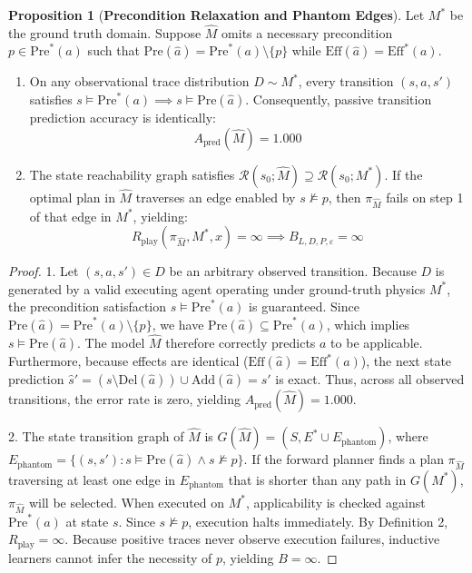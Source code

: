 \documentclass[11pt,a4paper]{article}
\theoremstyle{definition}
\newtheorem{proposition}{Proposition}
\begin{document}
\begin{proposition}[\textbf{Precondition Relaxation and Phantom Edges}]
Let $M^*$ be the ground truth domain. Suppose $\widehat{M}$ omits a necessary precondition $p \in \text{Pre}^*(a)$ such that $\text{Pre}(\widehat{a}) = \text{Pre}^*(a) \setminus \{p\}$ while $\text{Eff}(\widehat{a}) = \text{Eff}^*(a)$. 
\begin{enumerate}
    \item On any observational trace distribution $D \sim M^*$, every transition $(s, a, s')$ satisfies $s \models \text{Pre}^*(a) \implies s \models \text{Pre}(\widehat{a})$. Consequently, passive transition prediction accuracy is identically:
    \begin{equation}
    A_{\text{pred}}(\widehat{M}) = 1.000
    \end{equation}
    \item The state reachability graph satisfies $\mathcal{R}(s_0; \widehat{M}) \supseteq \mathcal{R}(s_0; M^*)$. If the optimal plan in $\widehat{M}$ traverses an edge enabled by $s \not\models p$, then $\pi_{\widehat{M}}$ fails on step 1 of that edge in $M^*$, yielding:
    \begin{equation}
    R_{\text{play}}(\pi_{\widehat{M}}, M^*, x) = \infty \implies B_{L, D, P, \varepsilon} = \infty
    \end{equation}
\end{enumerate}
\end{proposition}

\begin{proof}
1. Let $(s, a, s') \in D$ be an arbitrary observed transition. Because $D$ is generated by a valid executing agent operating under ground-truth physics $M^*$, the precondition satisfaction $s \models \text{Pre}^*(a)$ is guaranteed. Since $\text{Pre}(\widehat{a}) = \text{Pre}^*(a) \setminus \{p\}$, we have $\text{Pre}(\widehat{a}) \subseteq \text{Pre}^*(a)$, which implies $s \models \text{Pre}(\widehat{a})$. The model $\widehat{M}$ therefore correctly predicts $a$ to be applicable. Furthermore, because effects are identical ($\text{Eff}(\widehat{a}) = \text{Eff}^*(a)$), the next state prediction $\widehat{s}' = (s \setminus \text{Del}(\widehat{a})) \cup \text{Add}(\widehat{a}) = s'$ is exact. Thus, across all observed transitions, the error rate is zero, yielding $A_{\text{pred}}(\widehat{M}) = 1.000$.

2. The state transition graph of $\widehat{M}$ is $G(\widehat{M}) = (S, E^* \cup E_{\text{phantom}})$, where $E_{\text{phantom}} = \{ (s, s') : s \models \text{Pre}(\widehat{a}) \wedge s \not\models p \}$. If the forward planner finds a plan $\pi_{\widehat{M}}$ traversing at least one edge in $E_{\text{phantom}}$ that is shorter than any path in $G(M^*)$, $\pi_{\widehat{M}}$ will be selected. When executed on $M^*$, applicability is checked against $\text{Pre}^*(a)$ at state $s$. Since $s \not\models p$, execution halts immediately. By Definition 2, $R_{\text{play}} = \infty$. Because positive traces never observe execution failures, inductive learners cannot infer the necessity of $p$, yielding $B = \infty$.
\end{proof}
\end{document}
